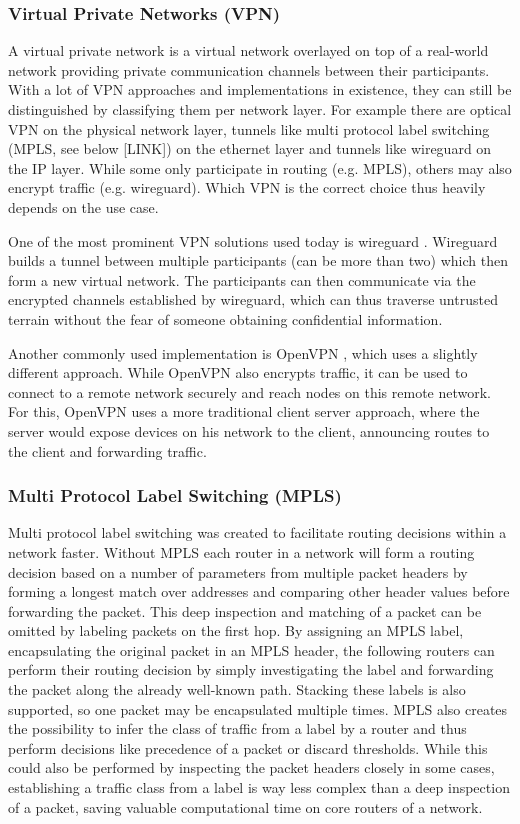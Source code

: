 \documentclass{article}
\begin{document}
\subsubsection{Virtual Private Networks (VPN)}
A virtual private network \cite{vpn} is a virtual network overlayed on top of a real-world network providing private communication channels between their participants. With a lot of VPN approaches and implementations in existence, they can still be distinguished by classifying them per network layer. For example there are optical VPN on the physical network layer, tunnels like multi protocol label switching (MPLS, see below [LINK]) on the ethernet layer and tunnels like wireguard \cite{wireguard} on the IP layer. While some only participate in routing (e.g. MPLS), others may also encrypt traffic (e.g. wireguard). Which VPN is the correct choice thus heavily depends on the use case.

One of the most prominent VPN solutions used today is wireguard \cite{wireguard}. Wireguard builds a tunnel between multiple participants (can be more than two) which then form a new virtual network. The participants can then communicate via the encrypted channels established by wireguard, which can thus traverse untrusted terrain without the fear of someone obtaining confidential information. %

Another commonly used implementation is OpenVPN \cite{openvpn}, which uses a slightly different approach. While OpenVPN also encrypts traffic, it can be used to connect to a remote network securely and reach nodes on this remote network. For this, OpenVPN uses a more traditional client server approach, where the server would expose devices on his network to the client, announcing routes to the client and forwarding traffic.

\subsubsection{Multi Protocol Label Switching (MPLS)}
Multi protocol label switching \cite{rfc3031} was created to facilitate routing decisions within a network faster. Without MPLS each router in a network will form a routing decision based on a number of parameters from multiple packet headers by forming a longest match over addresses and comparing other header values before forwarding the packet. This deep inspection and matching of a packet can be omitted by labeling packets on the first hop. By assigning an MPLS label, encapsulating the original packet in an MPLS header, the following routers can perform their routing decision by simply investigating the label and forwarding the packet along the already well-known path. Stacking these labels is also supported, so one packet may be encapsulated multiple times. MPLS also creates the possibility to infer the class of traffic from a label by a router and thus perform decisions like precedence of a packet or discard thresholds. While this could also be performed by inspecting the packet headers closely in some cases, establishing a traffic class from a label is way less complex than a deep inspection of a packet, saving valuable computational time on core routers of a network.
\end{document}
